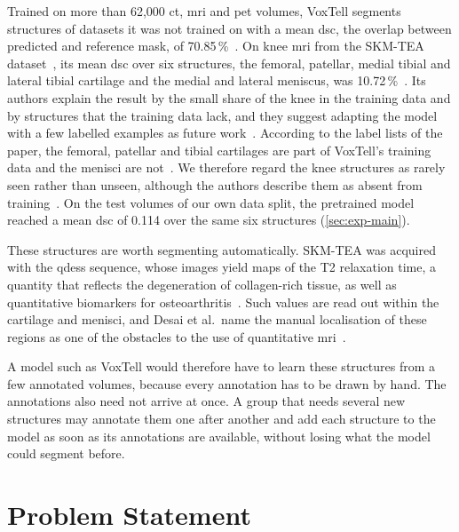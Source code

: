 Trained on more than 62{,}000 \gls{ct}, \gls{mri} and \gls{pet} volumes, VoxTell segments structures of datasets it was not trained on with a mean \gls{dsc}, the overlap between predicted and reference mask, of 70.85\,\%~\cite[Table~1]{rokuss2025voxtellfreetextpromptableuniversal}.
On knee \gls{mri} from the SKM-TEA dataset~\cite{desai2021skmtea}, its mean \gls{dsc} over six structures, the femoral, patellar, medial tibial and lateral tibial cartilage and the medial and lateral meniscus, was 10.72\,\%~\cite[Supplementary Table~9]{rokuss2025voxtellfreetextpromptableuniversal}.
Its authors explain the result by the small share of the knee in the training data and by structures that the training data lack, and they suggest adapting the model with a few labelled examples as future work~\cite[Sec.~6]{rokuss2025voxtellfreetextpromptableuniversal}.
According to the label lists of the paper, the femoral, patellar and tibial cartilages are part of VoxTell's training data and the menisci are not~\cite[Supplementary Tables~4, 5 and~10]{rokuss2025voxtellfreetextpromptableuniversal}.
We therefore regard the knee structures as rarely seen rather than unseen, although the authors describe them as absent from training~\cite[Sec.~6]{rokuss2025voxtellfreetextpromptableuniversal}.
On the test volumes of our own data split, the pretrained model reached a mean \gls{dsc} of 0.114 over the same six structures (\cref{sec:exp-main}).

These structures are worth segmenting automatically.
SKM-TEA was acquired with the \gls{qdess} sequence, whose images yield maps of the T2 relaxation time, a quantity that reflects the degeneration of collagen-rich tissue, as well as quantitative biomarkers for osteoarthritis~\cite{desai2021skmtea}.
Such values are read out within the cartilage and menisci, and Desai et al.\ name the manual localisation of these regions as one of the obstacles to the use of quantitative \gls{mri}~\cite{desai2021skmtea}.

A model such as VoxTell would therefore have to learn these structures from a few annotated volumes, because every annotation has to be drawn by hand.
The annotations also need not arrive at once.
A group that needs several new structures may annotate them one after another and add each structure to the model as soon as its annotations are available, without losing what the model could segment before.

\section{Problem Statement}
\label{sec:intro-problem}

